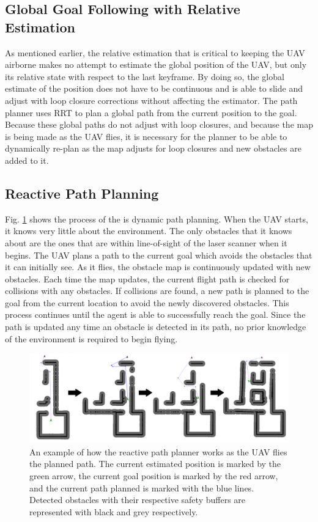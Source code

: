 \documentclass[letterpaper, 10 pt, conference]{ieeeconf}  %
\begin{document}
\subsection{Global Goal Following with Relative Estimation}

As mentioned earlier, the relative estimation that is critical to keeping the UAV airborne makes no attempt to estimate the global position of the UAV, but only its relative state with respect to the last keyframe. By doing so, the global estimate of the position does not have to be continuous and is able to slide and adjust with loop closure corrections without affecting the estimator. The path planner uses RRT to plan a global path from the current position to the goal. Because these global paths do not adjust with loop closures, and because the map is being made as the UAV flies, it is necessary for the planner to be able to dynamically re-plan as the map adjusts for loop closures and new obstacles are added to it.

\subsection{Reactive Path Planning}

Fig. \ref{fig:reactive_plan} shows the process of the is dynamic path planning. When the UAV starts, it knows very little about the environment. The only obstacles that it knows about are the ones that are within line-of-sight of the laser scanner when it begins. The UAV plans a path to the current goal which avoids the obstacles that it can initially see. As it flies, the obstacle map is continuously updated with new obstacles. Each time the map updates, the current flight path is checked for collisions with any obstacles. If collisions are found, a new path is planned to the goal from the current location to avoid the newly discovered obstacles. This process continues until the agent is able to successfully reach the goal. Since the path is updated any time an obstacle is detected in its path, no prior knowledge of the environment is required to begin flying.

\begin{figure}
\centering
\includegraphics[width=1.0\linewidth]{adaptive_path_plan2.png}
\caption{An example of how the reactive path planner works as the UAV flies the planned path. The current estimated position is marked by the green arrow, the current goal position is marked by the red arrow, and the current path planned is marked with the blue lines. Detected obstacles with their respective safety buffers are represented with black and grey respectively.}
\label{fig:reactive_plan}
\end{figure}
\end{document}
